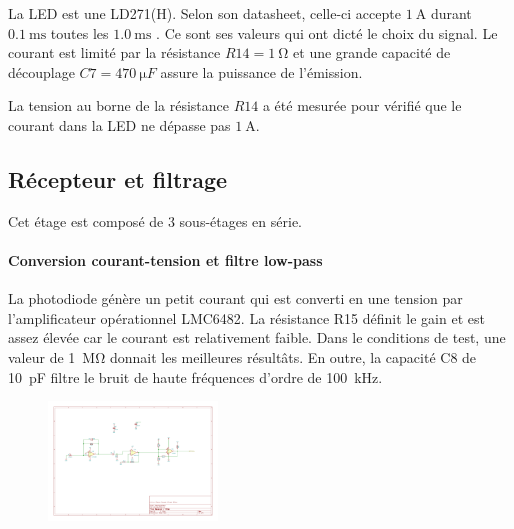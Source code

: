 \documentclass[french]{layout/Report}
\begin{document}
La LED est une LD271(H). Selon son datasheet, celle-ci accepte $\SI{1}{\ampere}$ durant $\SI{0.1}{\milli\second}$ toutes les $\SI{1.0}{\milli\second}$ \cite{LD271(H)}. Ce sont ses valeurs qui ont dicté le choix du signal. Le courant est limité par la résistance $\mathit{R14} = \SI{1}{\ohm}$ et une grande capacité de découplage $\mathit{C7}=\SI{470}{\micro F}$ assure la puissance de l'émission.

La tension au borne de la résistance $\mathit{R14}$ a été mesurée pour vérifié que le courant dans la LED ne dépasse pas $\SI{1}{\ampere}$.

\subsection{Récepteur et filtrage}
Cet étage est composé de 3 sous-étages en série.

\paragraph{Conversion courant-tension et filtre low-pass}

La photodiode génère un petit courant qui est converti en une tension par l'amplificateur opérationnel LMC6482.
La résistance R15 définit le gain et est assez élevée car le courant est relativement faible.
Dans le conditions de test, une valeur de \SI{1}{\mega\ohm} donnait les meilleures résultâts.
En outre, la capacité C8 de \SI{10}{\pico F} filtre le bruit de haute fréquences d'ordre de \SI{100}{\kilo Hz}.

\begin{figure}[h]
\centering
\includegraphics[width=0.4\textwidth]{fig/current_to_voltage_converter.pdf}
\end{figure}
\end{document}

